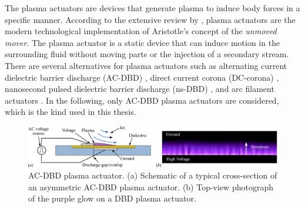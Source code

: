 The plasma actuators are devices that generate plasma to induce body forces in a specific manner. According to the extensive review by \citet{Kotsonis2015review}, plasma actuators are the modern technological implementation of Aristotle's concept of the \textit{unmoved mover}. The plasma actuator is a static device that can induce motion in the surrounding fluid without moving parts or the injection of a secondary stream. There are several alternatives for plasma actuators such as alternating current dielectric barrier discharge (AC-DBD) \citep{Roth1998dbd}, direct current corona (DC-corona) \citep{Leger2001corona}, nanosecond pulsed dielectric barrier discharge (ns-DBD) \citep{Roupassov2009nsplasma}, and arc filament actuators \citep{Samimy2004arcfilament}. In the following, only AC-DBD plasma actuators are considered, which is the kind used in this thesis.

\begin{figure}
    \centering
    \includegraphics[width = 0.99\linewidth]{figures/schematic_plasma.pdf}
    \caption{AC-DBD plasma actuator. (a) Schematic of a typical cross-section of an asymmetric AC-DBD plasma actuator. (b) Top-view photograph of the purple glow on a DBD plasma actuator.}
    \label{fig:schematic_plasma}
\end{figure}

